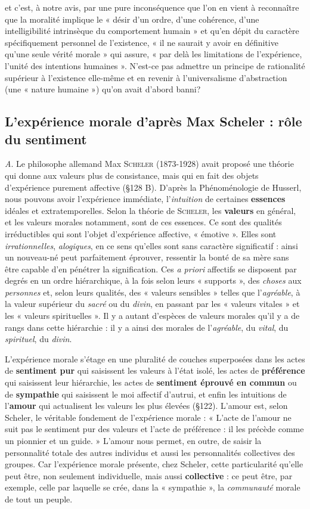 et c’est, à notre
avis, par une pure inconséquence que l’on en vient à reconnaître que
la moralité implique le « désir d’un ordre, d’une cohérence, d’une
intelligibilité intrinsèque du comportement humain » et qu’en dépit
du caractère spécifiquement personnel de l'existence, « il ne saurait
y avoir en définitive qu’une seule vérité morale » qui assure, « par
delà les limitations de l'expérience, l’unité des intentions humaines ».
N'est-ce pas admettre un principe de rationalité supérieur à l’existence
elle-même et en revenir à l’universalisme d’abstraction (une
« nature humaine ») qu’on avait d’abord banni?

\subsection{L'expérience morale d’après Max Scheler : rôle du sentiment}%
{\it A}. Le philosophe allemand Max \textsc{Scheler} (1873-1928)
avait proposé une théorie qui donne aux valeurs plus de consistance,
mais qui en fait des objets d'expérience purement affective (\S 128 B).
D’après la Phénoménologie de Husserl, nous pouvons avoir l’expérience
immédiate, l’{\it intuition} de certaines {\bf essences} idéales et extratemporelles.
Selon la théorie de \textsc{Scheler}, les {\bf valeurs} en général,
et les valeurs morales notamment, sont de ces essences. Ce sont
des qualités irréductibles qui sont l’objet d’expérience affective,
« émotive ». Elles sont {\it irrationnelles}, {\it alogiques}, en ce sens qu’elles
sont sans caractère significatif : ainsi un nouveau-né peut parfaitement
éprouver, ressentir la bonté de sa mère sans être capable d’en
pénétrer la signification. Ces {\it a priori} affectifs se disposent par degrés
en un ordre hiérarchique, à la fois selon leurs « supports », des {\it choses}
aux {\it personnes} et, selon leurs qualités, des « valeurs sensibles » telles
que l’{\it agréable}, à la valeur supérieur du {\it sacré} ou du {\it divin}, en passant
par les « valeurs vitales » et les « valeurs spirituelles ». Il y a autant
d’espèces de valeurs morales qu’il y a de rangs dans cette hiérarchie :
il y a ainsi des morales de l’{\it agréable}, du {\it vital}, du {\it spirituel}, du {\it divin}.

L'expérience morale s’étage en une pluralité de couches superposées
dans les actes de {\bf sentiment pur} qui saisissent les valeurs à l’état
isolé, les actes de {\bf préférence} qui saisissent leur hiérarchie, les actes de
{\bf sentiment éprouvé en commun} ou de {\bf sympathie} qui saisissent le
moi affectif d'autrui, et enfin les intuitions de l’{\bf amour} qui actualisent
les valeurs les plus élevées (\S 122). L'amour est, selon Scheler, le véritable
fondement de l’expérience morale : « L'acte de l’amour ne suit
pas le sentiment pur des valeurs et l’acte de préférence : il les précède
comme un pionnier et un guide. » L’amour nous permet, en outre,
de saisir la personnalité totale des autres individus et aussi les personnalités
collectives des groupes. Car l’expérience morale présente, chez
Scheler, cette particularité qu’elle peut être, non seulement individuelle,
mais aussi {\bf collective} : ce peut être, par exemple, celle par
laquelle se crée, dans la « sympathie », la {\it communauté} morale de tout
un peuple.

